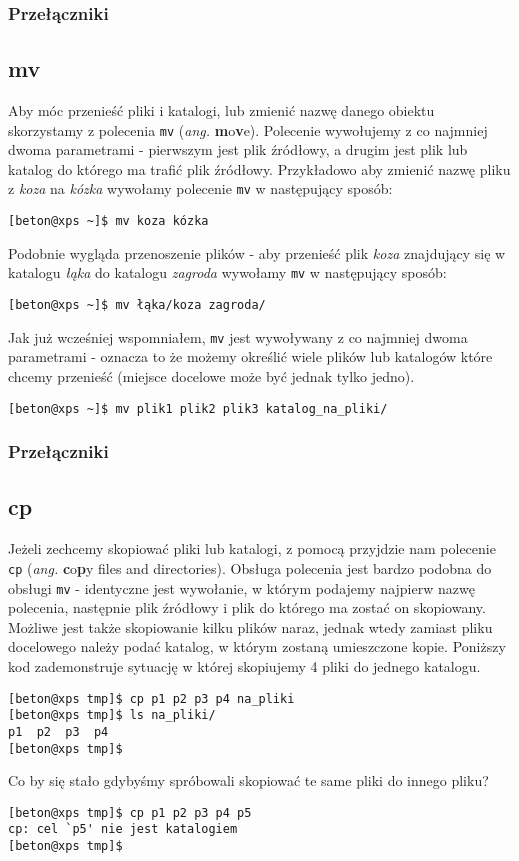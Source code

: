 \subsubsection*{Przełączniki}

\subsection{mv}
Aby móc przenieść pliki i katalogi, lub zmienić nazwę danego obiektu skorzystamy z polecenia \texttt{mv} (\textit{ang.} \textbf{m}o\textbf{v}e). Polecenie wywołujemy z co najmniej dwoma parametrami - pierwszym jest plik źródłowy, a drugim jest plik lub katalog do którego ma trafić plik źródłowy. Przykładowo aby zmienić nazwę pliku z \textit{koza} na \textit{kózka} wywołamy polecenie \texttt{mv} w następujący sposób:
\begin{verbatim}
[beton@xps ~]$ mv koza kózka
\end{verbatim}
Podobnie wygląda przenoszenie plików - aby przenieść plik \textit{koza} znajdujący się w katalogu \textit{łąka} do katalogu \textit{zagroda} wywołamy \texttt{mv} w następujący sposób:
\begin{verbatim}
[beton@xps ~]$ mv łąka/koza zagroda/
\end{verbatim}
Jak już wcześniej wspomniałem, \texttt{mv} jest wywoływany z co najmniej dwoma parametrami - oznacza to że możemy określić wiele plików lub katalogów które chcemy przenieść (miejsce docelowe może być jednak tylko jedno).
\begin{verbatim}
[beton@xps ~]$ mv plik1 plik2 plik3 katalog_na_pliki/
\end{verbatim}
\subsubsection*{Przełączniki}

\subsection{cp}
Jeżeli zechcemy skopiować pliki lub katalogi, z pomocą przyjdzie nam polecenie \texttt{cp} (\textit{ang.} \textbf{c}o\textbf{p}y files and directories). Obsługa polecenia jest bardzo podobna do obsługi \texttt{mv} - identyczne jest wywołanie, w którym podajemy najpierw nazwę polecenia, następnie plik źródłowy i plik do którego ma zostać on skopiowany. Możliwe jest także skopiowanie kilku plików naraz, jednak wtedy zamiast pliku docelowego należy podać katalog, w którym zostaną umieszczone kopie. Poniższy kod zademonstruje sytuację w której skopiujemy 4 pliki do jednego katalogu.
\begin{verbatim}
[beton@xps tmp]$ cp p1 p2 p3 p4 na_pliki
[beton@xps tmp]$ ls na_pliki/
p1  p2  p3  p4
[beton@xps tmp]$ 
\end{verbatim}
Co by się stało gdybyśmy spróbowali skopiować te same pliki do innego pliku?
\begin{verbatim}
[beton@xps tmp]$ cp p1 p2 p3 p4 p5
cp: cel `p5' nie jest katalogiem
[beton@xps tmp]$ 
\end{verbatim}

